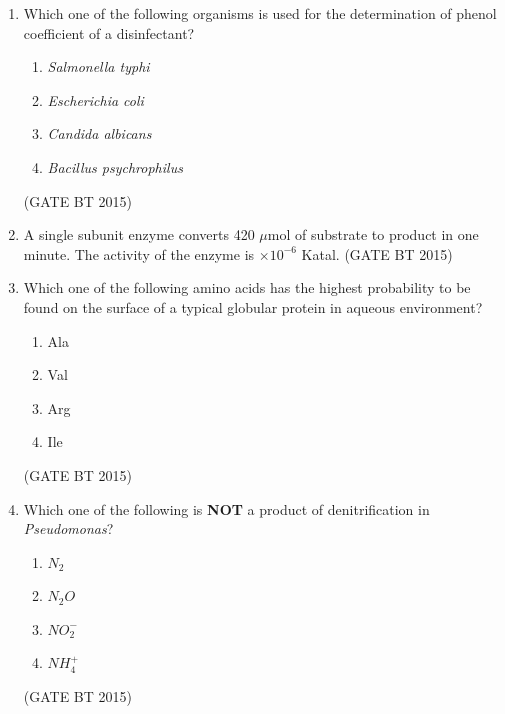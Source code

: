 \documentclass[journal,12pt,onecolumn]{IEEEtran}
\begin{document}
\begin{enumerate}[label=\textbf{Q.\arabic*}]
    \item Which one of the following organisms is used for the determination of phenol coefficient of a disinfectant?
    \begin{multicols}{2}
    \begin{enumerate}
        \item \textit{Salmonella typhi}  
        \item \textit{Escherichia coli}  
        \item \textit{Candida albicans}  
        \item \textit{Bacillus psychrophilus}  
    \end{enumerate}
    \end{multicols}             \hfill (GATE BT 2015)

    \item A single subunit enzyme converts 420 $\mu$mol of substrate to product in one minute. The activity of the enzyme is \underline{\hspace{2cm}} $\times 10^{-6}$ Katal.  
    \hfill(GATE BT 2015)

    \item Which one of the following amino acids has the highest probability to be found on the surface of a typical globular protein in aqueous environment?
    \begin{multicols}{4}
    \begin{enumerate}
        \item Ala  
        \item Val  
        \item Arg  
        \item Ile  
    \end{enumerate}
    \end{multicols}             \hfill (GATE BT 2015)

    \item Which one of the following is \textbf{NOT} a product of denitrification in \textit{Pseudomonas}?
    \begin{multicols}{4}
        \begin{enumerate}
            \item $N_{2}$
            \item $N_{2}O$
            \item $NO_{2}^{-}$
            \item $NH_{4}^{+}$
        \end{enumerate}
    \end{multicols}             \hfill (GATE BT 2015)


\end{enumerate}
\end{document}
